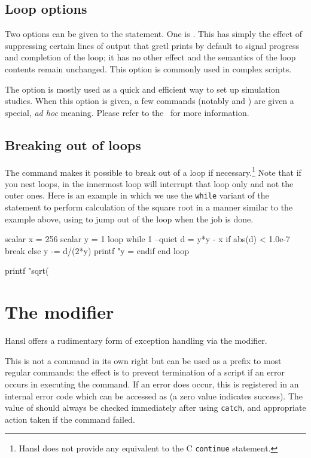 \subsection{Loop options}

Two options can be given to the  statement. One is
. This has simply the effect of suppressing certain
lines of output that gretl prints by default to signal progress and
completion of the loop; it has no other effect and the semantics of
the loop contents remain unchanged. This option is commonly used in
complex scripts.

The  option is mostly used as a quick and
efficient way to set up simulation studies. When this option is given,
a few commands (notably  and ) are given a
special, \emph{ad hoc} meaning. Please refer to the \GUG\ for more
information.
 
\subsection{Breaking out of loops}
\label{sec:loop-break}

The  command makes it possible to break out of a loop if
necessary.\footnote{Hansl does not provide any equivalent to the C
  \texttt{continue} statement.} Note that if you nest loops,
 in the innermost loop will interrupt that loop only and
not the outer ones.  Here is an example in which we use the
\texttt{while} variant of the  statement to perform
calculation of the square root in a manner similar to the example
above, using  to jump out of the loop when the job is done.
\begin{code}
scalar x = 256
scalar y = 1
loop while 1 --quiet
    d = y*y - x
    if abs(d) < 1.0e-7
        break
    else
        y -= d/(2*y)
        printf "y = %
    endif
end loop

printf "sqrt(%
\end{code}
\section{The  modifier}

Hansl offers a rudimentary form of exception handling via the
 modifier.

This is not a command in its own right but can be used as a prefix to
most regular commands: the effect is to prevent termination of a
script if an error occurs in executing the command. If an error does
occur, this is registered in an internal error code which can be
accessed as  (a zero value indicates success). The value
of  should always be checked immediately after using
\texttt{catch}, and appropriate action taken if the command failed.

